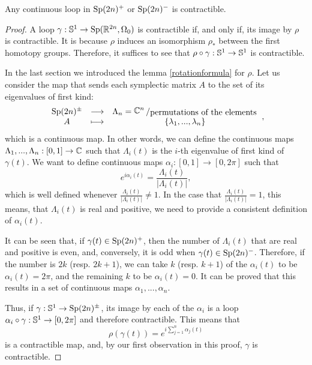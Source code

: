\begin{theo} \label{sppmcontractible}
Any continuous loop in $\text{Sp}(2n)^+$ or $\text{Sp}(2n)^-$ is contractible. 
\end{theo}

\begin{proof}
A loop $\gamma : \mathbb{S}^1 \rightarrow \text{Sp}(\mathbb{R}^{2n},\Omega_0)$ is contractible if, and only if, its image by $\rho$ is contractible. It is because $\rho$ induces an isomorphism $\rho_{\ast}$ between the first homotopy groups. Therefore, it suffices to see that $\rho \circ \gamma : \mathbb{S}^1 \rightarrow \mathbb{S}^1$ is contractible.

In the last section we introduced the lemma \ref{rotationformula} for $\rho$. Let us consider the map that sends each symplectic matrix $A$ to the set of its eigenvalues of first kind:
\[\begin{array}{ccc} \sympl(2n)^{\pm} & \longrightarrow & \Lambda_n = \quocient{\C^n}{\text{permutations of the elements}} \\ A & \longmapsto & \{\lambda_1,...,\lambda_n\} \end{array} ,\]
which is a continuous map. In other words, we can define the continuous maps $\Lambda_1,...,\Lambda_n : [0,1] \rightarrow \mathbb{C}$ such that $\Lambda_i(t)$ is the $i$-th eigenvalue of first kind of $\gamma(t)$. We want to define continuous maps $\alpha_i : [0,1] \rightarrow [0,2\pi]$ such that
\[e^{i \alpha_i(t)} = \frac{\Lambda_i(t)}{|\Lambda_i(t)|} ,\]
which is well defined whenever $\frac{\Lambda_i(t)}{|\Lambda_i(t)|} \neq 1$. In the case that $\frac{\Lambda_i(t)}{|\Lambda_i(t)|} = 1$, this means, that $\Lambda_i(t)$ is real and positive, we need to provide a consistent definition of $\alpha_i(t)$.

It can be seen that, if $\gamma(t) \in \text{Sp}(2n)^+$, then the number of $\Lambda_i(t)$ that are real and positive is even, and, conversely, it is odd when $\gamma(t) \in \text{Sp}(2n)^-$. Therefore, if the number is $2k$ (resp. $2k+1$), we can take $k$ (resp. $k+1$) of the $\alpha_i(t)$ to be $\alpha_i(t) = 2\pi$, and the remaining $k$ to be $\alpha_i(t) = 0$. It can be proved that this results in a set of continuous maps $\alpha_1,...,\alpha_n$.

Thus, if $\gamma : \mathbb{S}^1 \rightarrow \text{Sp}(2n)^{\pm}$, its image by each of the $\alpha_i$ is a loop $\alpha_i \circ \gamma : \mathbb{S}^1 \rightarrow [0,2\pi]$ and therefore contractible. This means that
\[\rho(\gamma(t)) = e^{i \sum_{j=1}^n \alpha_j(t)}\]
is a contractible map, and, by our first observation in this proof, $\gamma$ is contractible.
\end{proof}

